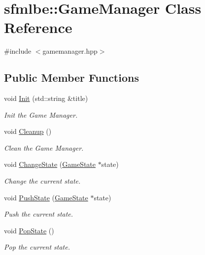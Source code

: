 \hypertarget{classsfmlbe_1_1_game_manager}{}\section{sfmlbe\+:\+:Game\+Manager Class Reference}
\label{classsfmlbe_1_1_game_manager}


{\ttfamily \#include $<$gamemanager.\+hpp$>$}

\subsection*{Public Member Functions}
\begin{DoxyCompactItemize}
\item 
void \mbox{\hyperlink{classsfmlbe_1_1_game_manager_a120f841a7f3cb2dfe21b78984c3e83bf}{Init}} (std\+::string \&title)
\begin{DoxyCompactList}\small\item\em Init the Game Manager. \end{DoxyCompactList}\item 
void \mbox{\hyperlink{classsfmlbe_1_1_game_manager_a718bd72362c1ba9504ca0852b2073f1b}{Cleanup}} ()
\begin{DoxyCompactList}\small\item\em Clean the Game Manager. \end{DoxyCompactList}\item 
void \mbox{\hyperlink{classsfmlbe_1_1_game_manager_a7bb485f2b11da154da6b3a2d1fa0860f}{Change\+State}} (\mbox{\hyperlink{classsfmlbe_1_1_game_state}{Game\+State}} $\ast$state)
\begin{DoxyCompactList}\small\item\em Change the current state. \end{DoxyCompactList}\item 
void \mbox{\hyperlink{classsfmlbe_1_1_game_manager_a63e4a2e13a8ce27e1c394fa942212dc1}{Push\+State}} (\mbox{\hyperlink{classsfmlbe_1_1_game_state}{Game\+State}} $\ast$state)
\begin{DoxyCompactList}\small\item\em Push the current state. \end{DoxyCompactList}\item 
void \mbox{\hyperlink{classsfmlbe_1_1_game_manager_a2c80186d2de5b168900bb91b05eb11ee}{Pop\+State}} ()
\begin{DoxyCompactList}\small\item\em Pop the current state. \end{DoxyCompactList}\item 

\end{DoxyCompactItemize}
